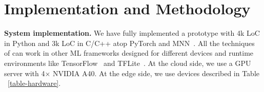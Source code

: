 \section{Implementation and Methodology}
\label{sec:impl}

% 





\noindent \textbf{System implementation.}
We have fully implemented a \sys prototype with 4k LoC in Python and 3k LoC in C/C++ atop PyTorch and MNN~\cite{MNN}.
All the techniques of \sys can work in other ML frameworks designed for different devices and runtime environments like TensorFlow~\cite{tf} and TFLite~\cite{tflite}.
At the cloud side, we use a GPU server with 4× NVIDIA A40. 
At the edge side, we use devices described in Table ~\ref{table-hardware}.


